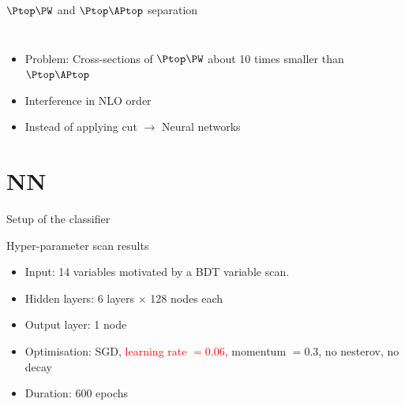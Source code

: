 \documentclass[10pt, UKenglish]{beamer}
\begin{document}
\begin{frame}{$\Ptop\PW$ and $\Ptop\APtop$ separation}
\begin{columns}
\begin{column}{0.5\textwidth}
\begin{figure}
        \end{figure}
    \end{column}
\end{columns}
\begin{itemize}
    \item Problem: Cross-sections of $\Ptop\PW$ about 10 times smaller than $\Ptop\APtop$
    \item Interference in NLO order
    \item Instead of applying cut $\longrightarrow$ Neural networks
\end{itemize}
\end{frame}

\section{NN}

\begin{frame}{Setup of the classifier}
\begin{block}{Hyper-parameter scan results}
\begin{itemize}
\item Input: \num{14} variables motivated by a BDT variable scan.
\item Hidden layers: \num{6} \ELU layers $\times$ \num{128} nodes each
\item Output layer: \num{1} \SIGMOID node
\item Optimisation: SGD, \textcolor{red}{learning rate $=0.06$}, momentum $=0.3$, no nesterov, no decay
\item Duration: 600 epochs
\end{itemize}
\end{block}
\end{frame}
\end{document}
